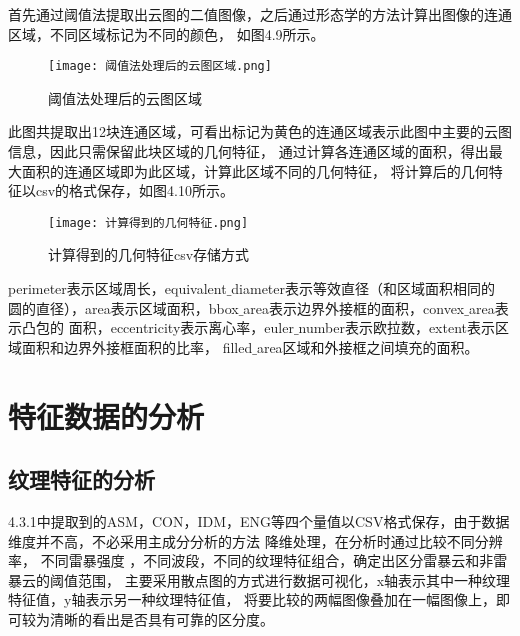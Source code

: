 首先通过阈值法提取出云图的二值图像，之后通过形态学的方法计算出图像的连通区域，不同区域标记为不同的颜色，
如图4.9所示。
\begin{figure}[htb]
    \centering
    \texttt{[image: 阈值法处理后的云图区域.png]}
    \caption{阈值法处理后的云图区域}
\end{figure}
此图共提取出12块连通区域，可看出标记为黄色的连通区域表示此图中主要的云图信息，因此只需保留此块区域的几何特征，
通过计算各连通区域的面积，得出最大面积的连通区域即为此区域，计算此区域不同的几何特征，
将计算后的几何特征以csv的格式保存，如图4.10所示。
\begin{figure}[htb]
    \centering
    \texttt{[image: 计算得到的几何特征.png]}
    \caption{计算得到的几何特征csv存储方式}
\end{figure}

perimeter表示区域周长，equivalent$\_$diameter表示等效直径（和区域面积相同的
圆的直径），area表示区域面积，bbox$\_$area表示边界外接框的面积，convex$\_$area表示凸包的
面积，eccentricity表示离心率，euler$\_$number表示欧拉数，extent表示区域面积和边界外接框面积的比率，
filled$\_$area区域和外接框之间填充的面积。

\iffalse
\subsection{频率特征提取}
影像频率是描述影像中光谱信息变化程度的的物理量。对于影像中的云层而言，
云层边缘灰度突变，因此分布在高频部分，
而云层内部灰度均匀，因此分布在低频部分。频率域为评价影像提供了一个全新的角度。
本文通过快速傅里叶变换，计算得出云图图像的幅度谱如图。

\begin{figure}[htb]
    \centering
    \texttt{[image: 卫星云图和FFT变换后的幅度谱.png]}
    \caption{卫星云图和FFT变换后的幅度谱}
\end{figure}
\fi


\section{特征数据的分析}
\subsection{纹理特征的分析}
4.3.1中提取到的ASM，CON，IDM，ENG等四个量值以CSV格式保存，由于数据维度并不高，不必采用主成分分析的方法
降维处理，在分析时通过比较不同分辨率，
不同雷暴强度 ，不同波段，不同的纹理特征组合，确定出区分雷暴云和非雷暴云的阈值范围，
主要采用散点图的方式进行数据可视化，x轴表示其中一种纹理特征值，y轴表示另一种纹理特征值，
将要比较的两幅图像叠加在一幅图像上，即可较为清晰的看出是否具有可靠的区分度。

